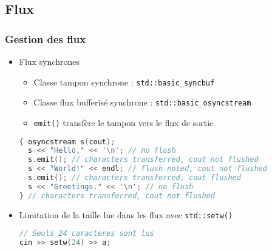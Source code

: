 \documentclass[C++.tex]{subfiles}
\begin{document}
\subsection*{Flux}
\begin{frame}[fragile]
	\frametitle{Gestion des flux}
	\begin{itemize}
		\item Flux synchrones
		\begin{itemize}
			\item Classe tampon synchrone : \lstinline|std::basic_syncbuf|
			\item Classe flux bufferisé synchrone : \lstinline|std::basic_osyncstream|
			\item \lstinline|emit()| transfère le tampon vers le flux de sortie
		\end{itemize}


		\begin{lstlisting}[language=C++]
{ osyncstream s(cout);
  s << "Hello," << '\n'; // no flush
  s.emit(); // characters transferred, cout not flushed
  s << "World!" << endl; // flush noted, cout not flushed
  s.emit(); // characters transferred, cout flushed
  s << "Greetings." << '\n'; // no flush
} // characters transferred, cout not flushed\end{lstlisting}

		\item Limitation de la taille lue dans les flux avec \lstinline|std::setw()|

		\begin{lstlisting}[language=C++]
// Seuls 24 caracteres sont lus
cin >> setw(24) >> a;\end{lstlisting}
	\end{itemize}
\end{frame}
\end{document}
